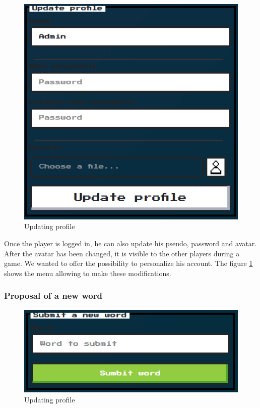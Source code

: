 \documentclass{tnreport}
\begin{document}
\begin{figure}
	\centering
	\vspace*{-2cm}
	\includegraphics[scale=0.5]{figures/update_profile}
	\caption{Updating profile}
	\label{fig:update_profile}
	\vspace*{-2cm}
\end{figure}

Once the player is logged in, he can also update his pseudo, password and avatar. After the avatar has been changed, it is visible to the other players during a game. We wanted to offer the possibility to personalize his account. The figure \ref{fig:update_profile} shows the menu allowing to make these modifications. 

\bigskip
\bigskip

\subsubsection{Proposal of a new word}

\begin{figure}
	\centering
	\includegraphics[scale=0.5]{figures/send_word}
	\caption{Updating profile}
	\label{fig:send_word}
\end{figure}
\end{document}
